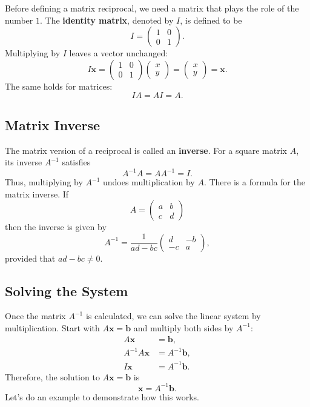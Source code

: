 \documentclass[10pt,letterpaper]{article}
\begin{document}
Before defining a matrix reciprocal, we need a matrix that plays the role of the number $1$. The \textbf{identity matrix}, denoted by $I$, is defined to be 
\[
I=
\begin{pmatrix}
1&0\\
0&1
\end{pmatrix}.
\]
Multiplying by $I$ leaves a vector unchanged:
\[
I\mathbf{x}
=
\begin{pmatrix}
1&0\\
0&1
\end{pmatrix}
\begin{pmatrix}x\\y\end{pmatrix}
=
\begin{pmatrix}x\\y\end{pmatrix}
=\mathbf{x}.
\]
The same holds for matrices:
\[
IA=AI=A.
\]

\subsection{Matrix Inverse}

The matrix version of a reciprocal is called an
\textbf{inverse}. For a square matrix $A$, its inverse
$A^{-1}$ satisfies
\[
A^{-1}A=AA^{-1}=I.
\]
Thus, multiplying by $A^{-1}$ undoes multiplication
by $A$. There is a formula for the matrix inverse. If
\[
A=\begin{pmatrix}a&b\\c&d\end{pmatrix}
\]
then the inverse is given by
\[
\boxed{
A^{-1}
=\frac{1}{ad-bc}
\begin{pmatrix}
d&-b\\
-c&a
\end{pmatrix},
}
\]
provided that $ad-bc \neq 0$.


\subsection{Solving the System}

Once the matrix $A^{-1}$ is calculated, we can solve the linear system by multiplication. Start with $A\textbf{x}=\textbf{b}$ and multiply both sides by $A^{-1}$:
\begin{align*}
A\mathbf{x}&=\mathbf{b},\\
A^{-1}A\mathbf{x}&=A^{-1}\mathbf{b},\\
I\mathbf{x}&=A^{-1}\mathbf{b}.
\end{align*}
Therefore, the solution to $A\textbf{x}=\textbf{b}$ is 
\[
\boxed{\mathbf{x}=A^{-1}\mathbf{b}.}
\]
Let's do an example to demonstrate how this works.
\end{document}
